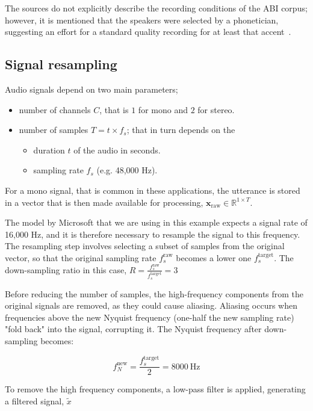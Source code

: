 \documentclass[conference]{IEEEtran}
\begin{document}
	The sources do not explicitly describe the recording conditions of the ABI corpus; however, it is mentioned that the speakers were selected by a phonetician, suggesting an effort for a standard quality recording for at least that accent~\cite{najafian2016improving}.
	
	\subsection{Signal resampling}
	\label{ssec:signal-resampling}
	
	Audio signals depend on two main parameters;
	
	\begin{itemize}
		\item number of channels $C$, that is $1$ for mono and $2$ for stereo.
		\item number of samples $T = t \times f_s$; that in turn depends on the
		\begin{itemize}
			\item duration $t$ of the audio in seconds.
			\item sampling rate $f_s$ (e.g. 48,000 Hz).
		\end{itemize}
	\end{itemize}
	
	For a mono signal, that is common in these applications, the utterance is stored in a vector that is then made available for processing,  $\mathbf{x}_{\text{raw}} \in \mathbb{R}^{1 \times T}$.
	
	The model by Microsoft that we are using in this example expects a signal rate of 16,000 Hz, and it is therefore necessary to resample the signal to this frequency. The resampling step involves selecting a subset of samples from the original vector, so that the original sampling rate $f_s^{\text{raw}}$ becomes a lower one $f_s^{\text{target}}$. The down-sampling ratio in this case, $R = \frac{f_s^{\text{raw}}}{f_s^{\text{target}}} = 3$
	
	Before reducing the number of samples, the high-frequency components from the original signals are removed, as they could cause aliasing. Aliasing occurs when frequencies above the new Nyquist frequency (one-half the new sampling rate) "fold back" into the signal, corrupting it. The Nyquist frequency after down-sampling becomes:
	
	$$f_N^{\text{new}} = \frac{f_s^{\text{target}}}{2} = 8000~\text{Hz}$$
	
	To remove the high frequency components, a low-pass filter is applied, generating a filtered signal, $\tilde{x}$
	
\end{document}
